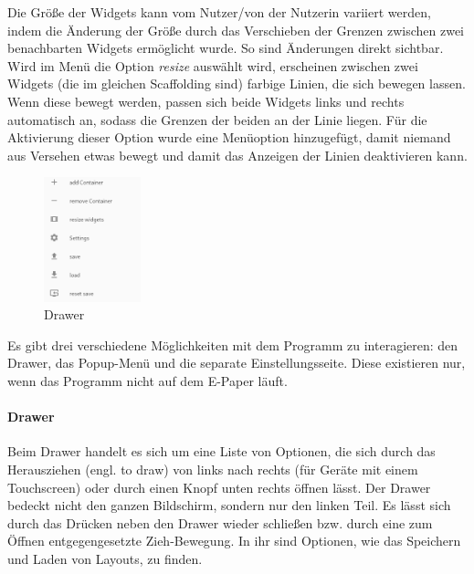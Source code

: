 \documentclass[10pt]{article}
\begin{document}
Die Größe der Widgets kann vom Nutzer/von der Nutzerin variiert werden, indem die Änderung der Größe durch das Verschieben der Grenzen zwischen zwei benachbarten Widgets ermöglicht wurde. So sind Änderungen direkt sichtbar.
 Wird im Menü die Option \textit{resize} auswählt wird, erscheinen zwischen zwei Widgets (die im gleichen Scaffolding sind) farbige Linien, die sich bewegen lassen. Wenn diese bewegt werden, passen sich beide Widgets links und rechts automatisch an, sodass die Grenzen der beiden an der Linie liegen.
Für die Aktivierung dieser Option wurde eine Menüoption hinzugefügt, damit niemand aus Versehen etwas bewegt und damit das Anzeigen der Linien deaktivieren kann.\begin{figure}
  \centering \includegraphics[width=0.25\textwidth]{Screenshot_20230113_192743.png}
  \caption{Drawer}
\end{figure}
Es gibt drei verschiedene Möglichkeiten mit dem Programm zu interagieren: den Drawer, das Popup-Menü und die separate Einstellungsseite. Diese existieren nur, wenn das Programm nicht auf dem E-Paper läuft.

\paragraph{Drawer}
Beim Drawer handelt es sich um eine Liste von Optionen, die sich durch das Herausziehen (engl. to draw) von links nach rechts (für Geräte mit einem Touchscreen) oder durch einen Knopf unten rechts öffnen lässt. Der Drawer bedeckt nicht den ganzen Bildschirm, sondern nur den linken Teil. Es lässt sich durch das Drücken neben den Drawer wieder schließen bzw. durch eine zum Öffnen entgegengesetzte Zieh-Bewegung. In ihr sind Optionen, wie das Speichern und Laden von Layouts, zu finden.
\end{document}

